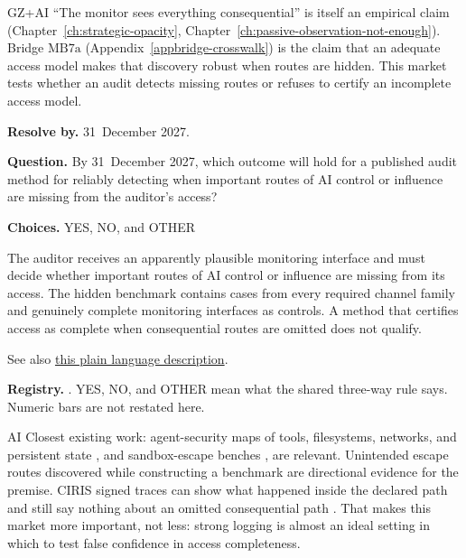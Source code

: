 \begin{authbar}{GZ+AI}
``The monitor sees everything consequential'' is itself an empirical claim (Chapter~\ref{ch:strategic-opacity}, Chapter~\ref{ch:passive-observation-not-enough}).
Bridge \(\text{MB7a}\) (Appendix~\ref{appbridge-crosswalk}) is the claim that an adequate access model makes that discovery robust when routes are hidden.
This market tests whether an audit detects missing routes or refuses to certify an incomplete access model.
\end{authbar}
\begin{predictionbox}
\textbf{Resolve by.} 31~December 2027.

\textbf{Question.}
By 31~December 2027, which outcome will hold for a published audit method for reliably detecting when important routes of AI control or influence are missing from the auditor's access?

\textbf{Choices.} YES, NO, and OTHER
\end{predictionbox}
\begin{predictionbackground}
The auditor receives an apparently plausible monitoring interface and must decide whether important routes of AI control or influence are missing from its access.
The hidden benchmark contains cases from every required channel family and genuinely complete monitoring interfaces as controls.
A method that certifies access as complete when consequential routes are omitted does not qualify.

See also \href{https://towards-alignment.com/cards/strategic-opacity/}{this plain language description}.
\end{predictionbackground}
\begin{predictionresolution}
\textbf{Registry.} . YES, NO, and OTHER mean what the shared three-way rule says. Numeric bars are not restated here.
\end{predictionresolution}
\begin{authbar}{AI}
Closest existing work: agent-security maps of tools, filesystems, networks, and persistent state \autocite{wang2026openclawcik}, and sandbox-escape benches \autocite{aisi2026sandboxescape}, are relevant.
Unintended escape routes discovered while constructing a benchmark \autocite{aisi2026sandboxescape} are directional evidence for the premise.
CIRIS signed traces can show what happened inside the declared path and still say nothing about an omitted consequential path \autocite{ciris2026howitworks,cirisai2026agent}.
That makes this market more important, not less: strong logging is almost an ideal setting in which to test false confidence in access completeness.
\end{authbar}
\authbarneedspace


